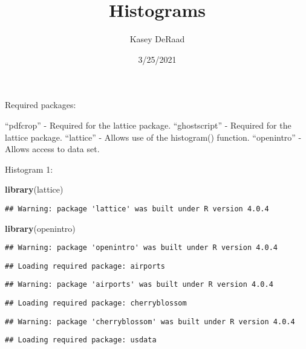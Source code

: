 \documentclass[
]{article}
\title{Histograms}
\author{Kasey DeRaad}
\date{3/25/2021}
\newenvironment{Shaded}{\begin{snugshade}}{\end{snugshade}}
\newcommand{\KeywordTok}[1]{\textcolor[rgb]{0.13,0.29,0.53}{\textbf{#1}}}
\newcommand{\NormalTok}[1]{#1}
\begin{document}
\maketitle

Required packages:

``pdfcrop'' - Required for the lattice package. ``ghostscript'' -
Required for the lattice package. ``lattice'' - Allows use of the
histogram() function. ``openintro'' - Allows access to data set.

Histogram 1:

\begin{Shaded}
\begin{Highlighting}[]
\KeywordTok{library}\NormalTok{(lattice)}
\end{Highlighting}
\end{Shaded}

\begin{verbatim}
## Warning: package 'lattice' was built under R version 4.0.4
\end{verbatim}

\begin{Shaded}
\begin{Highlighting}[]
\KeywordTok{library}\NormalTok{(openintro)}
\end{Highlighting}
\end{Shaded}

\begin{verbatim}
## Warning: package 'openintro' was built under R version 4.0.4
\end{verbatim}

\begin{verbatim}
## Loading required package: airports
\end{verbatim}

\begin{verbatim}
## Warning: package 'airports' was built under R version 4.0.4
\end{verbatim}

\begin{verbatim}
## Loading required package: cherryblossom
\end{verbatim}

\begin{verbatim}
## Warning: package 'cherryblossom' was built under R version 4.0.4
\end{verbatim}

\begin{verbatim}
## Loading required package: usdata
\end{verbatim}
\end{document}
